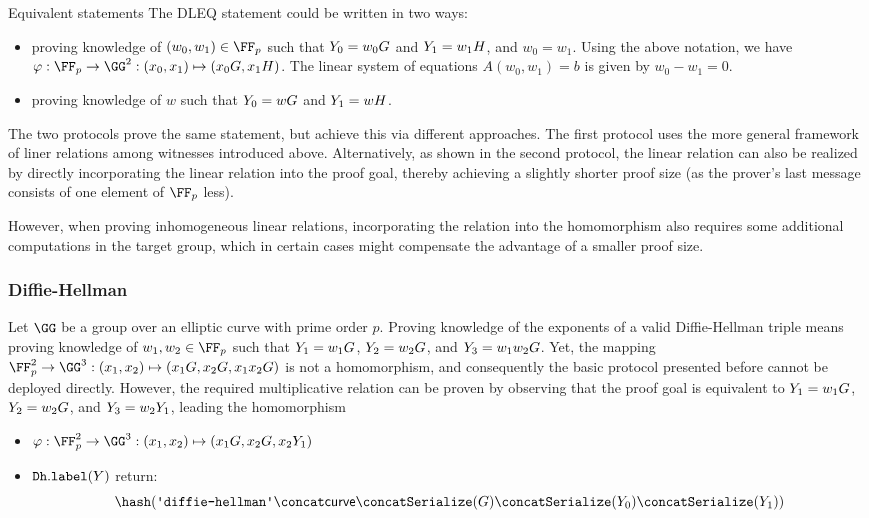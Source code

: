 \documentclass[11pt]{article}
\begin{document}
\begin{remark}{Equivalent statements}{}
  The DLEQ statement could be written in two ways:
  \begin{itemize}
    \item proving knowledge of $(w_0,w_1)\in\FF_p$ such that $Y_0=w_0G$ and $Y_1=w_1H$, and $w_0=w_1$.
  Using the above notation, we have $\varphi:\FF_p\to\GG^2:(x_0,x_1)\mapsto (x_0G,x_1H)$.
  The linear system of equations $A(w_0,w_1)=b$ is given by $w_0-w_1=0$.

  \item proving knowledge of $w$ such that $Y_0 = wG$ and $Y_1 = w H$.
  \end{itemize}
  The two protocols prove the same statement, but achieve this via different approaches.
  The first protocol uses the more general framework of liner relations among witnesses introduced above.
  Alternatively, as shown in the second protocol, the linear relation can also be realized by  directly incorporating the linear relation into the proof goal, thereby achieving a slightly shorter proof size (as the prover's last message consists of one element of $\FF_p$ less).

  However, when proving inhomogeneous linear relations, incorporating the relation into the homomorphism also requires some additional computations in the target group, which in certain cases might compensate the advantage of a smaller proof size.
\end{remark}


\subsubsection{Diffie-Hellman}
Let $\GG$ be a group over an elliptic curve with prime order $p$.
Proving knowledge of the exponents of a valid Diffie-Hellman triple means proving knowledge of $w_1,w_2\in\FF_p$ such that $Y_1=w_1G$, $Y_2=w_2G$, and $Y_3=w_1 w_2 G$.
Yet, the mapping $\FF_p^2\to\GG^3:(x_1,x_2)\mapsto (x_1G,x_2G,x_1x_2G)$ is not a homomorphism, and consequently the basic protocol presented before cannot be deployed directly.
However, the required multiplicative relation can be proven by observing that the proof goal is equivalent to $Y_1=w_1G$, $Y_2=w_2G$, and $Y_3=w_2Y_1$, leading the homomorphism

\begin{itemize}
  \item  $\varphi:\FF_p^2\to\GG^3:(x_1,x_2)\mapsto(x_1G,x_2G,x_2\statement_1)$
  \item $\texttt{Dh}.\texttt{label}(Y)$ return:
  \[
    \hash(\dhlabel \concat \curvectx \concat \serialize(G) \concat \serialize(\statement_0) \concat \serialize(\statement_1))
  \]
\end{itemize}
\end{document}
